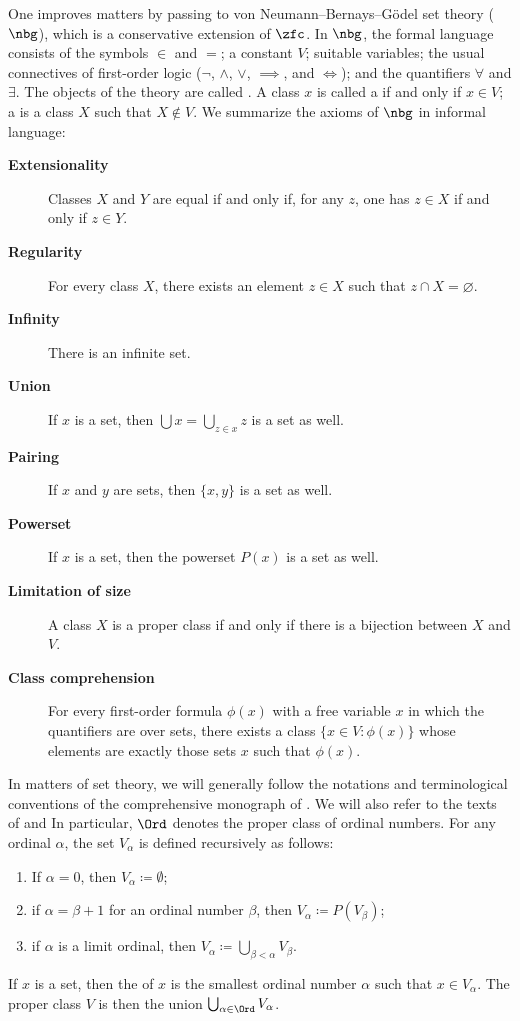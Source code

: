 One improves matters by passing to von Neumann--Bernays--Gödel set theory ($\nbg$),
which is a conservative extension of $\zfc$.
In $ \nbg $, the formal language consists of the symbols $\in$ and $=$;
a constant $V$; suitable variables;
the usual connectives of first-order logic ($\neg$, $\wedge$, $\vee$, $\implies$, and $\iff$);
and the quantifiers $\forall$ and $\exists$.
The objects of the theory are called .
A class $ x $ is called a  if and only if $x \in V$;
a  is a class $ X $ such that $ X \notin V $.
We summarize the axioms of $ \nbg $ in informal language:
\begin{description}
	\item[\textbf{Extensionality}] Classes $ X $ and $ Y $ are equal if and only if,
		for any $ z $, one has $ z \in X $ if and only if $ z \in Y $.
	\item[\textbf{Regularity}] For every class $ X $,
		there exists an element $ z \in X $ such that $ z \cap X = \varnothing $.
	\item[\textbf{Infinity}] There is an infinite set.
	\item[\textbf{Union}] If $ x $ is a set, then $ \bigcup x = \bigcup_{z \in x} z $ is a set as well.
	\item[\textbf{Pairing}] If $ x $ and $ y $ are sets, then $ \{x,y\} $ is a set as well.
	\item[\textbf{Powerset}] If $ x $ is a set, then the powerset $ P(x) $ is a set as well.
	\item[\textbf{Limitation of size}] A class $X$ is a proper class if and only if
		there is a bijection between $X$ and $V$.
	\item[\textbf{Class comprehension}] For every first-order formula $ \phi(x) $ with a free variable $ x $ in which the quantifiers are over sets,
		there exists a class $ \{ x \in V : \phi(x) \} $ whose elements are exactly those sets $ x $ such that $ \phi(x) $.
\end{description}

In matters of set theory,
we will generally follow the notations and terminological conventions
of the comprehensive monograph of \cite{Jech2003}.
We will also refer to the texts of \cite{Drake1974} and \cite{Kanamori2009}
In particular, $ \Ord $ denotes the proper class of ordinal numbers.
For any ordinal $ \alpha $, the set $ V_{\alpha} $ is defined recursively as follows:
\begin{enumerate}
	\item If $ \alpha = 0 $, then $ V_{\alpha} \coloneq \emptyset $;
	\item if $ \alpha = \beta + 1 $ for an ordinal number $ \beta $, then $ V_{\alpha} \coloneq P(V_{\beta}) $;
	\item if $ \alpha $ is a limit ordinal, then $ V_{\alpha} \coloneq \bigcup_{\beta < \alpha} V_{\beta} $.
\end{enumerate}
If $ x $ is a set, then the  of $ x $ is the smallest ordinal number $ \alpha $ such that $ x \in V_{\alpha} $.
The proper class $ V $ is then the union $ \bigcup_{\alpha \in \Ord} V_{\alpha} $.

